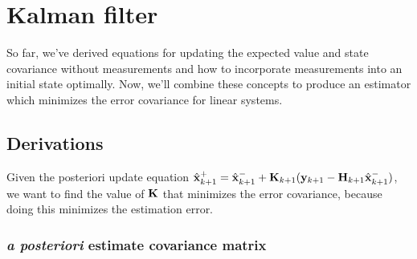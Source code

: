 \section{Kalman filter}

So far, we've derived equations for updating the expected value and state
covariance without measurements and how to incorporate measurements into an
initial state optimally. Now, we'll combine these concepts to produce an
estimator which minimizes the error covariance for linear systems.

\subsection{Derivations}

Given the posteriori update equation $\hat{\mathbf{x}}_{k+1}^+ =
\hat{\mathbf{x}}_{k+1}^- + \mathbf{K}_{k+1}(\mathbf{y}_{k+1} -
\mathbf{H}_{k+1} \hat{\mathbf{x}}_{k+1}^-)$, we want to find the value of $\mathbf{K}$
that minimizes the error covariance, because doing this minimizes the estimation
error.

\subsubsection{\textit{a posteriori} estimate covariance matrix}

